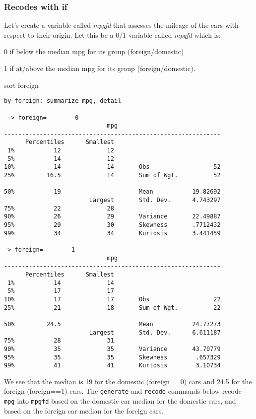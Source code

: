 \subsubsection{Recodes with if}

Let's create a variable called \textit{mpgfd} that assesses the mileage of the cars with respect to their origin. Let this be a 0/1 variable called \textit{mpgfd} which is:
\begin{compactitem}
\item 0 if below the median mpg for its group (foreign/domestic)
\item 1 if at/above the median mpg for its group (foreign/domestic).
\end{compactitem}
sort foreign

\begin{lstlisting}
by foreign: summarize mpg, detail

 -> foreign=        0
                             mpg
-------------------------------------------------------------
      Percentiles      Smallest
 1%           12             12
 5%           14             12
10%           14             14       Obs                  52
25%         16.5             14       Sum of Wgt.          52

50%           19                      Mean           19.82692
                        Largest       Std. Dev.      4.743297
75%           22             28
90%           26             29       Variance       22.49887
95%           29             30       Skewness       .7712432
99%           34             34       Kurtosis       3.441459

-> foreign=        1
                             mpg
-------------------------------------------------------------
      Percentiles      Smallest
 1%           14             14
 5%           17             17
10%           17             17       Obs                  22
25%           21             18       Sum of Wgt.          22

50%         24.5                      Mean           24.77273
                        Largest       Std. Dev.      6.611187
75%           28             31
90%           35             35       Variance       43.70779
95%           35             35       Skewness        .657329
99%           41             41       Kurtosis        3.10734
\end{lstlisting}

We see that the median is 19 for the domestic (foreign==0) cars and 24.5 for the foreign (foreign==1) cars. The \lstinline{generate} and \lstinline{recode} commands below recode \lstinline{mpg} into \lstinline{mpgfd} based on the domestic car median for the domestic cars, and based on the foreign car median for the foreign cars.

